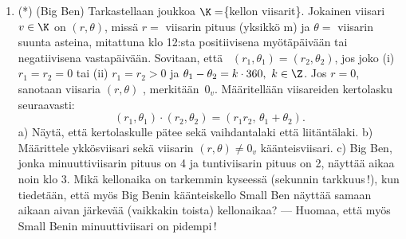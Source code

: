 \begin{enumerate}
\item(*) \label{H-I-2: Big Ben} 
(Big Ben) Tarkastellaan joukkoa $\K=$\{kellon viisarit\}. Jokainen viisari $v\in\K$ on 
 $(r,\theta)$, missä $r=$ viisarin pituus (yksikkö m) ja $\theta =$ viisarin 
suunta asteina, mitattuna klo 12:sta positiivisena myötäpäivään tai negatiivisena vastapäivään.
Sovitaan, että \ $(r_1,\theta _1)=(r_2,\theta _2)$, jos joko (i) $r_1=r_2=0$ tai
(ii) $r_1=r_2>0$ ja $\theta _1-\theta _2=k \cdot 360,\ k\in\Z$. Jos $r=0$, sanotaan viisaria
$(r,\theta)$ , merkitään\ $0_v$. Määritellään viisareiden kertolasku
seuraavasti:
\[
(r_1,\theta _1)\cdot (r_2, \theta _2) = (r_1r_2,\,\theta _1+\theta _2).
\]
a) Näytä, että kertolaskulle pätee sekä vaihdantalaki että liitäntälaki.
\newline
b) Määrittele ykkösviisari sekä viisarin $(r, \theta) \neq 0_v$ käänteisviisari.
\newline
c) Big Ben, jonka minuuttiviisarin pituus on 4 ja tuntiviisarin pituus on 2,
näyttää aikaa noin klo 3. Mikä kellonaika on tarkemmin kyseessä (sekunnin tarkkuus\,!), kun
tiedetään, että myös Big Benin käänteiskello Small Ben näyttää samaan aikaan aivan järkevää
(vaikkakin toista) kellonaikaa?  --- Huomaa, että myös Small Benin minuuttiviisari on pidempi\,!

\end{enumerate}